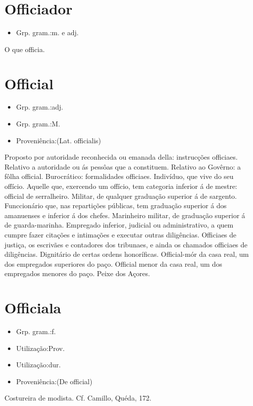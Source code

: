 \section{Officiador}
\begin{itemize}
\item {Grp. gram.:m.  e  adj.}
\end{itemize}
O que officia.
\section{Official}
\begin{itemize}
\item {Grp. gram.:adj.}
\end{itemize}
\begin{itemize}
\item {Grp. gram.:M.}
\end{itemize}
\begin{itemize}
\item {Proveniência:(Lat. \textunderscore officialis\textunderscore )}
\end{itemize}
Proposto por autoridade reconhecida ou emanada della: \textunderscore instrucções officiaes\textunderscore .
Relativo a autoridade ou ás pessôas que a constituem.
Relativo ao Govêrno: \textunderscore a fôlha official\textunderscore .
Burocrático: \textunderscore formalidades officiaes\textunderscore .
Indivíduo, que vive do seu offício.
Aquelle que, exercendo um offício, tem categoria inferior á de mestre: \textunderscore official de serralheiro\textunderscore .
Militar, de qualquer graduação superior á de sargento.
Funccionário que, nas repartições públicas, tem graduação superior á dos amanuenses e inferior á dos chefes.
Marinheiro militar, de graduação superior á de guarda-marinha.
Empregado inferior, judicial ou administrativo, a quem cumpre fazer citações e intimações e executar outras diligências.
\textunderscore Officiaes de justiça\textunderscore , os escrivães e contadores dos tribunaes, e ainda os chamados officiaes de diligências.
Dignitário de certas ordens honoríficas.
\textunderscore Official-mór da casa real\textunderscore , um dos empregados superiores do paço.
\textunderscore Official menor da casa real\textunderscore , um dos empregados menores do paço.
Peixe dos Açores.
\section{Officiala}
\begin{itemize}
\item {Grp. gram.:f.}
\end{itemize}
\begin{itemize}
\item {Utilização:Prov.}
\end{itemize}
\begin{itemize}
\item {Utilização:dur.}
\end{itemize}
\begin{itemize}
\item {Proveniência:(De \textunderscore official\textunderscore )}
\end{itemize}
Costureira de modista. Cf. Camillo, \textunderscore Quéda\textunderscore , 172.
